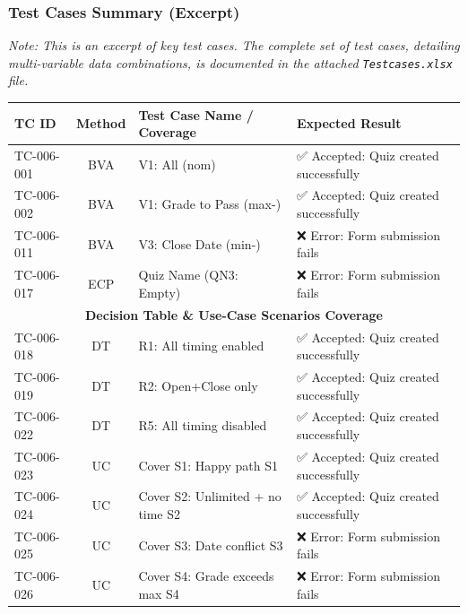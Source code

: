 \documentclass[twoside,final]{hcmut-report}
\begin{document}
\subsubsection{Test Cases Summary (Excerpt)}
\textit{Note: This is an excerpt of key test cases. The complete set of test cases, detailing multi-variable data combinations, is documented in the attached \texttt{Testcases.xlsx} file.}

\begin{table}[H]
\centering
\renewcommand{\arraystretch}{1.2}
\begin{tabularx}{\textwidth}{|l|c|X|X|}
\hline
\textbf{TC ID} & \textbf{Method} & \textbf{Test Case Name / Coverage} & \textbf{Expected Result} \\ \hline
TC-006-001 & BVA & V1: All (nom) & ✅ Accepted: Quiz created successfully \\ \hline
TC-006-002 & BVA & V1: Grade to Pass (max-) & ✅ Accepted: Quiz created successfully \\ \hline
TC-006-011 & BVA & V3: Close Date (min-) & ❌ Error: Form submission fails \\ \hline
TC-006-017 & ECP & Quiz Name (QN3: Empty) & ❌ Error: Form submission fails \\ \hline
\multicolumn{4}{|c|}{\cellcolor{gray!20}\textbf{Decision Table \& Use-Case Scenarios Coverage}} \\ \hline
TC-006-018 & DT  & R1: All timing enabled & ✅ Accepted: Quiz created successfully \\ \hline
TC-006-019 & DT  & R2: Open+Close only & ✅ Accepted: Quiz created successfully \\ \hline
TC-006-022 & DT  & R5: All timing disabled & ✅ Accepted: Quiz created successfully \\ \hline
TC-006-023 & UC  & Cover S1: Happy path S1 & ✅ Accepted: Quiz created successfully \\ \hline
TC-006-024 & UC  & Cover S2: Unlimited + no time S2 & ✅ Accepted: Quiz created successfully \\ \hline
TC-006-025 & UC  & Cover S3: Date conflict S3 & ❌ Error: Form submission fails \\ \hline
TC-006-026 & UC  & Cover S4: Grade exceeds max S4 & ❌ Error: Form submission fails \\ \hline
\end{tabularx}
\end{table}

\newpage
\end{document}
